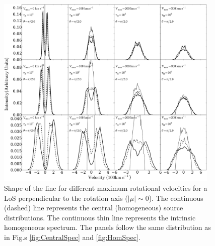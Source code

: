 \documentclass{emulateapj}
\newcommand{\ly}{{\ifmmode{{\rm Ly}\alpha~}\else{Ly$\alpha$~}\fi}}
\begin{document}
\begin{figure}
\begin{center}
  \includegraphics[width=0.95\textwidth]{f4.pdf}
\end{center}
\caption{Shape of the \ly line for different maximum rotational
  velocities for a LoS perpendicular to the rotation axis
  ($|\mu|\sim 0$). The continuous (dashed) line represents the central
  (homogeneous) source distributions. The continuous thin line
represents the intrinsic homogeneous spectrum. The panels follow the same
  distribution as in Fig.s \ref{fig:CentralSpec} and \ref{fig:HomSpec}.
    \label{fig:differentvelocities}}  
\end{figure}
\end{document}
